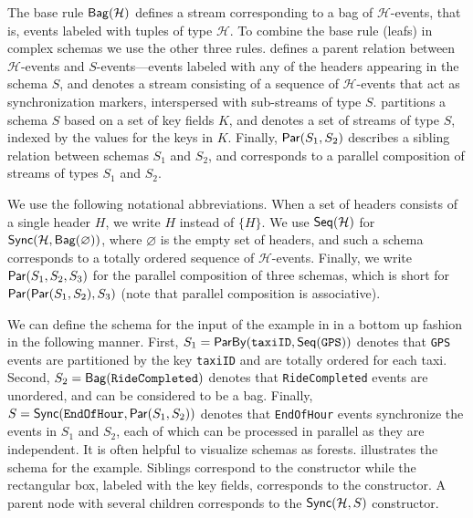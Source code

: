 The base rule $\mathsf{Bag}({\mathcal{H}})$  defines a stream corresponding to a bag of $\mathcal{H}$-events, that is, events labeled with tuples of type $\mathcal{H}$. To combine the base rule (leafs) in complex schemas we use the other three rules.  defines a parent relation between $\mathcal{H}$-events
and $S$-events---events labeled with any of the headers appearing in the schema $S$, and denotes a stream consisting of a sequence of $\mathcal{H}$-events that act as synchronization markers, interspersed with sub-streams of type $S$.
 partitions a schema $S$ based on a set of key fields $K$,
and denotes a set of streams of type $S$, indexed by the values for the keys in $K$.
Finally, $\mathsf{Par}({S_1}, {S_2})$ describes a sibling relation between schemas $S_1$ and $S_2$,  and corresponds to a parallel composition
of streams of types $S_1$ and $S_2$.

We use the following notational abbreviations.
When a set of headers consists of a single header $H$, we write $H$ instead of $\{H\}$.
We use $\mathsf{Seq}({\mathcal{H}})$ for
$\mathsf{Sync}({\mathcal{H}}, \mathsf{Bag}({\varnothing}))$,
 where $\varnothing$ is the empty set of headers, and such a schema corresponds to a totally ordered sequence of $\mathcal{H}$-events.
Finally, we write $\mathsf{Par}({{S}_1}, {{S}_2}, {{S}_3})$
for the parallel composition of three schemas, which is short for
$\mathsf{Par}({\mathsf{Par}({{S}_1}, {{S}_2})}, {{S}_3})$ (note that parallel composition is associative).

\begin{example}
\label{ex:taxi-distance-schema}
We can define the schema for the input of the example in   in a bottom up fashion in the following manner.
First, $S_1 = \mathsf{ParBy}({\texttt{taxiID}}, \mathsf{Seq}({\texttt{GPS}}))$ denotes that \texttt{GPS} events are partitioned by the key \texttt{taxiID} and  are totally ordered for each taxi.
Second, $S_2 = \mathsf{Bag}({\texttt{RideCompleted}})$ denotes that \texttt{RideCompleted} events are unordered, and can be considered to be a bag.
Finally, $S = \mathsf{Sync}({\texttt{EndOfHour}}, \mathsf{Par}({S_1}, {S_2}))$ denotes that \texttt{EndOfHour} events synchronize the events in $S_1$ and $S_2$, each of which can be processed in parallel as they are independent.
It is often helpful to visualize schemas as forests.  illustrates the schema for the example.
Siblings correspond to the  constructor while the rectangular box,
labeled with the key fields, corresponds to the  constructor.
A parent node with several children corresponds to the $\mathsf{Sync}({\mathcal{H}}, S)$ constructor.
\end{example}

